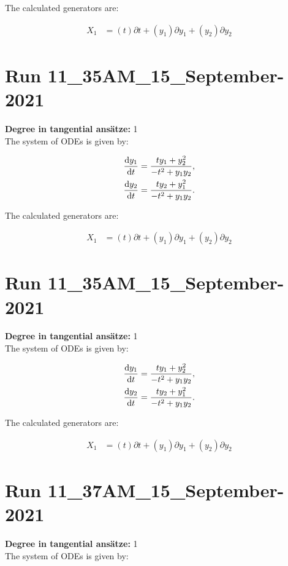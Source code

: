 \noindent The calculated generators are:

\begin{align*}
X_{1}&=\left( t \right)\partial t+\left( y_{1} \right)\partial y_{1}+\left( y_{2} \right)\partial y_{2}\end{align*}
\section*{Run 11\_35AM\_15\_September-2021}
\textbf{Degree in tangential ansätze:}	1\\
The system of ODEs is given by:

\begin{align*}
\dv{y_{1}}{t}&=\frac{t y_{1} + y_{2}^{2}}{- t^{2} + y_{1} y_{2}},\\
\dv{y_{2}}{t}&=\frac{t y_{2} + y_{1}^{2}}{- t^{2} + y_{1} y_{2}}.\\
\end{align*}

\noindent The calculated generators are:

\begin{align*}
X_{1}&=\left( t \right)\partial t+\left( y_{1} \right)\partial y_{1}+\left( y_{2} \right)\partial y_{2}\end{align*}
\section*{Run 11\_35AM\_15\_September-2021}
\textbf{Degree in tangential ansätze:}	1\\
The system of ODEs is given by:

\begin{align*}
\dv{y_{1}}{t}&=\frac{t y_{1} + y_{2}^{2}}{- t^{2} + y_{1} y_{2}},\\
\dv{y_{2}}{t}&=\frac{t y_{2} + y_{1}^{2}}{- t^{2} + y_{1} y_{2}}.\\
\end{align*}

\noindent The calculated generators are:

\begin{align*}
X_{1}&=\left( t \right)\partial t+\left( y_{1} \right)\partial y_{1}+\left( y_{2} \right)\partial y_{2}\end{align*}
\section*{Run 11\_37AM\_15\_September-2021}
\textbf{Degree in tangential ansätze:}	1\\
The system of ODEs is given by:

